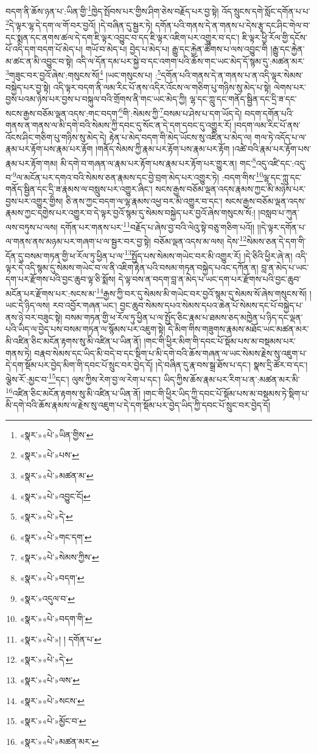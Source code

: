 བདག་ནི་ཆོས་ཉན་པ་:ཡིན་གྱི་\footnote{«སྣར་»«པེ་»ཡིན་གྱིས་}ཁྱེད་སྤོབས་པར་གྱིས་ཤིག་ཅེས་བརྗོད་པར་བྱ་སྟེ། འོད་སྲུངས་དགེ་སློང་དགོན་པ་པ་\footnote{«སྣར་»«པེ་»པས་}དེ་ལྟར་ལྷ་དེ་དག་ལ་གོ་བར་བྱའོ། །དེ་བཞིན་དུ་སྦྱར་ཏེ། དགོན་པའི་གནས་དེ་ན་གནས་པ་དེས་རྩྭ་དང་ཤིང་གེལ་བ་དང་སྨན་དང་ནགས་ཚལ་དེ་དག་ཇི་ལྟར་འབྱུང་བ་དད་ཇི་ལྟར་འཇིག་པར་འགྱུར་བ་དང་། ཇི་ལྟར་ཕྱི་རོལ་གྱི་དངོས་པོ་འདི་དག་བདག་པོ་མེད་པ། གཡོ་བ་མེད་པ། བྱེད་པ་མེད་པ། རྒྱུ་དང་རྐྱེན་ཚོགས་པ་ལས་འབྱུང་གི །རྒྱུ་དང་རྐྱེན་མ་ཚང་ན་མི་འབྱུང་བ་སྟེ། འདི་ལ་དོན་དམ་པར་སྐྱེ་བ་དང་འགག་པའི་ཆོས་གང་ཡང་མེད་དོ་སྙམ་དུ་:མཚན་མར་\footnote{«སྣར་»«པེ་»མཚན་མ་}གཟུང་བར་བྱའོ་ཞེས་:གསུངས་སོ།\footnote{«སྣར་»«པེ་»འབྱུང་ངོ།} །ཡང་གསུངས་པ། :\footnote{«སྣར་»«པེ་»དེ་}དགོན་པའི་གནས་དེ་ན་གནས་པ་ན་འདི་ལྟར་སེམས་བསྐྱེད་པར་བྱ་སྟེ། འདི་ལྟར་བདག་ནི་ལམ་རིང་པོ་ནས་འདིར་འོངས་ལ་གཅིག་པུ་གཉིས་སུ་མེད་པ་སྟེ། ལེགས་པར་བྱས་པའམ་ཉེས་པར་བྱས་པ་བསྐུལ་བའི་གྲོགས་ནི་གང་ཡང་མེད་ཀྱི། ལྷ་དང་ཀླུ་དང་གནོད་སྦྱིན་དང་དྲི་ཟ་དང་སངས་རྒྱས་བཅོམ་ལྡན་འདས་:གང་བདག་\footnote{«སྣར་»«པེ་»གང་དག་}གི་:སེམས་ཀྱི་\footnote{«སྣར་»«པེ་»སེམས་ཀྱིས་}བསམ་པ་ཤེས་པ་དག་ཡོད་དེ། བདག་དགོན་པའི་གནས་ན་གནས་ལ་མི་དགེ་བའི་སེམས་ཀྱི་དབང་དུ་སོང་ན་དེ་དག་དབང་དུ་འགྱུར་རོ། །བདག་ལམ་རིང་པོ་ནས་འོངས་ཤིང་གཅིག་པུ་གཉིས་སུ་མེད་དེ། རྟེན་པ་མེད་བདག་གི་མེད་ཡོངས་སུ་འཛིན་པ་མེད་ལ། གལ་ཏེ་འདོད་པ་ལ་རྣམ་པར་རྟོག་པས་རྣམ་པར་རྟོག །གནོད་སེམས་ཀྱི་རྣམ་པར་རྟོག་པས་རྣམ་པར་རྟོག །འཚེ་བའི་རྣམ་པར་རྟོག་པས་རྣམ་པར་རྟོག་གམ། མི་དགེ་བ་གཞན་ལ་རྣམ་པར་རྟོག་པས་རྣམ་པར་རྟོག་པར་གྱུར་ན། གང་\footnote{«སྣར་»«པེ་»བདག་}འདུ་འཛི་དང་:འདུ་བ་\footnote{«སྣར་»འདུལ་བ་}ལ་མངོན་པར་དགའ་བའི་སེམས་ཅན་རྣམས་དང་བྱེ་བྲག་མེད་པར་འགྱུར་ཏེ། :བདག་གིས་\footnote{«སྣར་»«པེ་»བདག་གི་}ལྷ་དང་ཀླུ་དང་གནོད་སྦྱིན་དང་དྲི་ཟ་རྣམས་ལ་བསླུས་པར་འགྱུར་ཞིང་། སངས་རྒྱས་བཅོམ་ལྡན་འདས་རྣམས་ཀྱང་མི་མཉེས་པར་བྱས་པར་འགྱུར་གྱིས། ཅི་ནས་ཀྱང་བདག་ལ་ལྷ་རྣམས་འཕྱ་བར་མི་འགྱུར་བ་དང་། སངས་རྒྱས་བཅོམ་ལྡན་འདས་རྣམས་ཀྱང་དགྱེས་པར་འགྱུར་བ་དེ་ལྟར་བྱའོ་སྙམ་དུ་སེམས་བསྐྱེད་པར་བྱའོ་ཞེས་གསུངས་སོ:། །བསླབ་པ་ཀུན་ལས་བཏུས་པ་ལས། དགོན་པར་གནས་པར་\footnote{«སྣར་»«པེ་»། ། དགོན་པ་}བརྗོད་པ་ཞེས་བྱ་བའི་ལེའུ་སྟེ་བཅུ་གཅིག་པའོ།། །།དེ་ལྟར་དགོན་པ་ལ་གནས་ནས་མཉམ་པར་གཞག་པ་ལ་སྦྱར་བར་བྱ་སྟེ། བཅོམ་ལྡན་འདས་མ་ལས། དེས་\footnote{«སྣར་»«པེ་»དེ་}སེམས་ཅན་དེ་དག་གི་དོན་དུ་བསམ་གཏན་གྱི་ཕ་རོལ་ཏུ་ཕྱིན་པ་ལ་\footnote{«སྣར་»«པེ་»ལས་}སྤྱོད་པས་སེམས་གཡེང་བར་མི་འགྱུར་རོ། །དེ་ཅིའི་ཕྱིར་ཞེ་ན། འདི་ལྟར་དེ་འདི་སྙམ་དུ་སེམས་གཡེང་བ་ལ་ནི་འཇིག་རྟེན་པའི་བསམ་གཏན་བསྐྱེད་པའང་དཀོན་ན། བླ་ན་མེད་པ་ཡང་དག་པར་རྫོགས་པའི་བྱང་ཆུབ་ལྟ་ཅི་སྨོས། དེ་ལྟ་བས་ན་བདག་བླ་ན་མེད་པ་ཡང་དག་པར་རྫོགས་པའི་བྱང་ཆུབ་མངོན་པར་རྫོགས་པར་:སངས་མ་\footnote{«སྣར་»«པེ་»སངས་}རྒྱས་ཀྱི་བར་དུ་སེམས་མི་གཡེང་བར་བྱའོ་སྙམ་དུ་སེམས་སོ་ཞེས་གསུངས་སོ། །ཡང་དེ་ཉིད་ལས། རབ་འབྱོར་གཞན་ཡང་། བྱང་ཆུབ་སེམས་དཔའ་སེམས་དཔའ་ཆེན་པོ་སེམས་དང་པོ་བསྐྱེད་པ་ནས་ཉེ་བར་བཟུང་སྟེ། བསམ་གཏན་གྱི་ཕ་རོལ་ཏུ་ཕྱིན་པ་ལ་སྤྱོད་ཅིང་རྣམ་པ་ཐམས་ཅད་མཁྱེན་པ་ཉིད་དང་ལྡན་པའི་ཡིད་ལ་བྱེད་པས་བསམ་གཏན་ལ་སྙོམས་པར་འཇུག་སྟེ། དེ་མིག་གིས་གཟུགས་རྣམས་མཐོང་ཡང་མཚན་མར་མི་འཛིན་ཅིང་མངོན་རྟགས་སུ་མི་འཛིན་པ་ཡིན་ནོ། །གང་གི་ཕྱིར་མིག་གི་དབང་པོ་སྡོམ་པས་མ་བསྡམས་པར་གནས་ཏེ། བརྣབ་སེམས་དང་ཡིད་མི་བདེ་བ་དང་སྡིག་པ་མི་དགེ་བའི་ཆོས་གཞན་ལ་ཡང་སེམས་རྗེས་སུ་འཇུག་པ་དེ་དག་སྡོམ་པར་བྱེད་མིག་གི་དབང་པོ་སྲུང་བར་བྱེད་དོ། །དེ་བཞིན་དུ་རྣ་བས་སྒྲ་ཐོས་པ་དང་། སྣས་དྲི་ཚོར་བ་དང་། ལྕེས་རོ་:མྱང་བ་\footnote{«སྣར་»«པེ་»མྱོང་བ་}དང་། ལུས་ཀྱིས་རེག་བྱ་ལ་རེག་པ་དང་། ཡིད་ཀྱིས་ཆོས་རྣམ་པར་རིག་པ་ན་:མཚན་མར་མི་\footnote{«སྣར་»«པེ་»མཚན་མར་}འཛིན་ཅིང་མངོན་རྟགས་སུ་མི་འཛིན་པ་ཡིན་ནོ། །གང་གི་ཕྱིར་ཡིད་ཀྱི་དབང་པོ་སྡོམ་པས་མ་བསྡམས་ཏེ་སྡིག་པ་མི་དགེ་བའི་ཆོས་རྣམས་ལ་རྗེས་སུ་འཇུག་པ་དེ་དག་སྡོམ་པར་བྱེད་ཡིད་ཀྱི་དབང་པོ་སྲུང་བར་བྱེད་དོ། 
